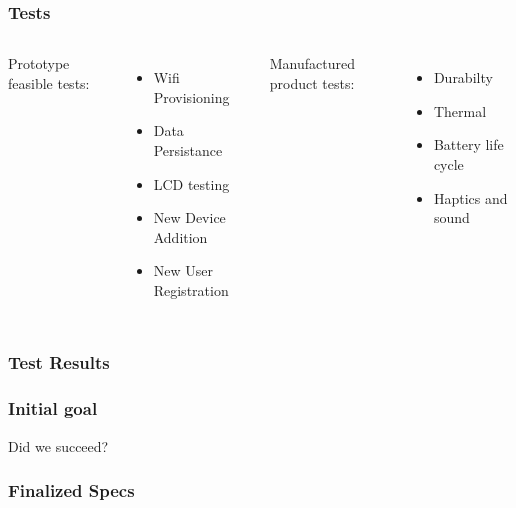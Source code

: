 \documentclass{beamer}
\begin{document}
\begin{frame}
  \frametitle{Tests}
  \begin{columns}
    Prototype feasible tests:
    \begin{itemize}
      \item Wifi Provisioning
      \item Data Persistance
      \item LCD testing
      \item New Device Addition
      \item New User Registration 
    \end{itemize}

    Manufactured product tests:
    \begin{itemize}
      \item Durabilty
      \item Thermal
      \item Battery life cycle
      \item Haptics and sound
    \end{itemize}
  \end{columns}
\end{frame}

\begin{frame}
  \frametitle{Test Results}
\end{frame}

\begin{frame}
  \frametitle{Initial goal}

  

  \begin{center}
    Did we succeed?
  \end{center}

\end{frame}

\begin{frame}
  \frametitle{Finalized Specs}
  

\end{frame}
\end{document}

